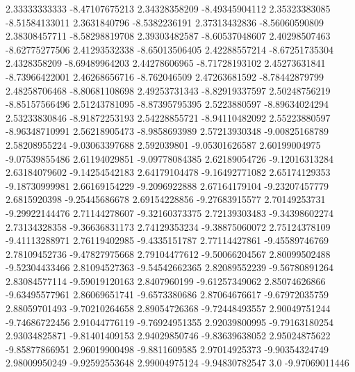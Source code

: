   2.33333333333   -8.47107675213
  2.34328358209   -8.49345904112
  2.35323383085   -8.51584133011
   2.3631840796    -8.5382236191
  2.37313432836   -8.56060590809
  2.38308457711   -8.58298819708
  2.39303482587   -8.60537048607
  2.40298507463   -8.62775277506
  2.41293532338   -8.65013506405
  2.42288557214   -8.67251735304
   2.4328358209   -8.69489964203
  2.44278606965   -8.71728193102
  2.45273631841   -8.73966422001
  2.46268656716     -8.762046509
  2.47263681592   -8.78442879799
  2.48258706468   -8.80681108698
  2.49253731343   -8.82919337597
  2.50248756219   -8.85157566496
  2.51243781095   -8.87395795395
   2.5223880597   -8.89634024294
  2.53233830846   -8.91872253193
  2.54228855721   -8.94110482092
  2.55223880597   -8.96348710991
  2.56218905473    -8.9858693989
  2.57213930348   -9.00825168789
  2.58208955224   -9.03063397688
    2.592039801   -9.05301626587
  2.60199004975   -9.07539855486
  2.61194029851   -9.09778084385
  2.62189054726   -9.12016313284
  2.63184079602   -9.14254542183
  2.64179104478   -9.16492771082
  2.65174129353   -9.18730999981
  2.66169154229    -9.2096922888
  2.67164179104   -9.23207457779
   2.6815920398   -9.25445686678
  2.69154228856   -9.27683915577
  2.70149253731   -9.29922144476
  2.71144278607   -9.32160373375
  2.72139303483   -9.34398602274
  2.73134328358   -9.36636831173
  2.74129353234   -9.38875060072
  2.75124378109   -9.41113288971
  2.76119402985    -9.4335151787
  2.77114427861   -9.45589746769
  2.78109452736   -9.47827975668
  2.79104477612   -9.50066204567
  2.80099502488   -9.52304433466
  2.81094527363   -9.54542662365
  2.82089552239   -9.56780891264
  2.83084577114   -9.59019120163
   2.8407960199   -9.61257349062
  2.85074626866   -9.63495577961
  2.86069651741    -9.6573380686
  2.87064676617   -9.67972035759
  2.88059701493   -9.70210264658
  2.89054726368   -9.72448493557
  2.90049751244   -9.74686722456
  2.91044776119   -9.76924951355
  2.92039800995   -9.79163180254
  2.93034825871   -9.81401409153
  2.94029850746   -9.83639638052
  2.95024875622   -9.85877866951
  2.96019900498    -9.8811609585
  2.97014925373   -9.90354324749
  2.98009950249   -9.92592553648
  2.99004975124   -9.94830782547
            3.0   -9.97069011446
